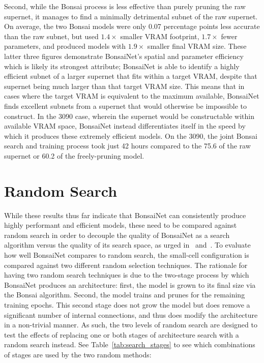 Second, while the Bonsai process is less effective than purely pruning the raw supernet, it manages to find a minimally
detrimental subnet of the raw supernet. On average, the two Bonsai models were only 0.07 percentage points less accurate
than the raw subnet, but used $1.4\times$ smaller VRAM footprint, $1.7\times$ fewer parameters, and produced models with
$1.9\times$ smaller final VRAM size. These latter three figures demonstrate BonsaiNet's spatial and parameter efficiency
which is likely its strongest attribute; BonsaiNet is able to identify a highly efficient subnet of a larger supernet
that fits within a target VRAM, despite that supernet being much larger than that target VRAM size. This means that in cases where the
target VRAM is equivalent to the maximum available, BonsaiNet finds excellent subnets from a supernet that would otherwise
be impossible to construct. In the 3090 case, wherein the supernet would be constructable within available VRAM space, BonsaiNet
instead differentiates itself in the speed by which it produces these extremely efficient models. On the 3090, the joint
Bonsai search and training process took just 42 hours compared to the 75.6 of the raw supernet or 60.2 of the freely-pruning model.


\section{Random Search}
While these results thus far indicate that BonsaiNet can consistently produce highly performant and efficient models,
these need to be compared against random search in order to decouple the quality of BonsaiNet as a search algorithm versus
the quality of its search space, as urged in~\cite{li2019} and~\cite{yu2019}.
To evaluate how well BonsaiNet compares to random search, the small-cell configuration is compared against two different
random selection techniques. The rationale for having two random search techniques is due to the two-stage process
by which BonsaiNet produces an architecture: first, the model is grown to its final size via the Bonsai algorithm.
Second, the model trains and prunes for the remaining training epochs. This second stage does not grow the model but does remove a significant
number of internal connections, and thus does modify the architecture in a non-trivial manner. As such, the two levels
of random search are designed to test the effects of replacing one or both stages of architecture search with a random
search instead. See Table~\ref{tab:search_stages} to see which combinations of stages are used by the two random methods:


